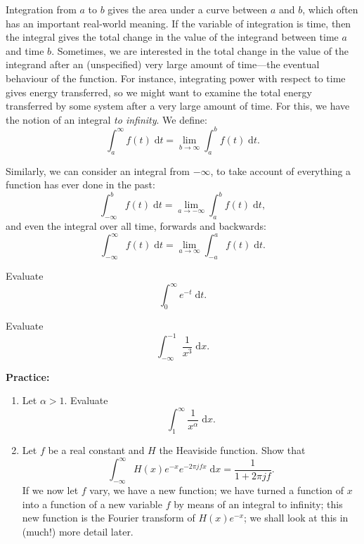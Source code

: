 \documentclass{article}
\newcommand{\diff}{\;\mathrm{d}}
\begin{document}
Integration from $a$ to $b$ gives the area under a curve between $a$ and $b$, which often has an important real-world meaning. If the variable of integration is time, then the integral gives the total change in the value of the integrand between time $a$ and time $b$. Sometimes, we are interested in the total change in the value of the integrand after an (unspecified) very large amount of time---the eventual behaviour of the function. For instance, integrating power with respect to time gives energy transferred, so we might want to examine the total energy transferred by some system after a very large amount of time. For this, we have the notion of an integral \textit{to infinity}. We define:
\[\int_a^\infty f(t)\diff t = \lim_{b\to \infty} \int_a^b f(t)\diff t.\]

Similarly, we can consider an integral from $-\infty$, to take account of everything a function has ever done in the past:
\[\int_{-\infty}^b f(t)\diff t=\lim_{a\to-\infty}\int_a^b f(t)\diff t,\]
and even the integral over all time, forwards and backwards:
\[\int_{-\infty}^\infty f(t)\diff t = \lim_{a\to \infty}\int _{-a}^a f(t)\diff t.\]

\bigskip

Evaluate
\[\int_0^\infty e^{-t}\diff t.\]

\vfill

Evaluate
\[\int_{-\infty}^{-1}\frac{1}{x^3}\diff x.\]
 


\clearpage


















\textbf{Practice:}\bigskip





\begin{enumerate}
	\item Let $\alpha>1$. Evaluate
		\[\int_1^\infty \frac{1}{x^\alpha}\diff x.\]
	\item Let $f$ be a real constant and $H$ the Heaviside function. Show that
		\[\int_{-\infty}^\infty H(x)e^{-x}e^{-2\pi j f x} \diff x=\frac{1}{1+2\pi jf}.\]
		If we now let $f$ vary, we have a new function; we have turned a function of $x$ into a function of a new variable $f$ by means of an integral to infinity; this new function is the Fourier transform of $H(x)e^{-x}$; we shall look at this in (much!) more detail later.
\end{enumerate}
\end{document}
